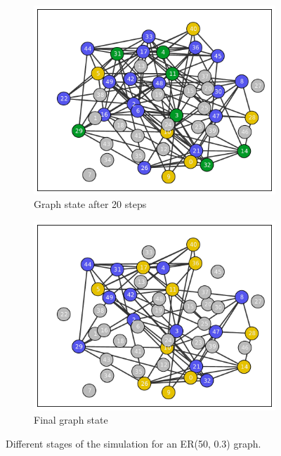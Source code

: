 \documentclass[11pt]{article} %
\begin{document}
\begin{figure}[tb]
\begin{subfigure}[b]{0.5\textwidth}
    \includegraphics[width=\textwidth]{figures/evo_ER_50_03_20}
    \caption{Graph state after 20 steps}
  \end{subfigure}
  \begin{subfigure}[b]{0.5\textwidth}
    \centering
    \includegraphics[width=\textwidth]{figures/evo_ER_50_03_final}
    \caption{Final graph state}
  \end{subfigure}
  \caption{Different stages of the simulation for an ER(50, 0.3) graph.}
  \label{fig:er_graph_evo}
\end{figure}
\end{document}
